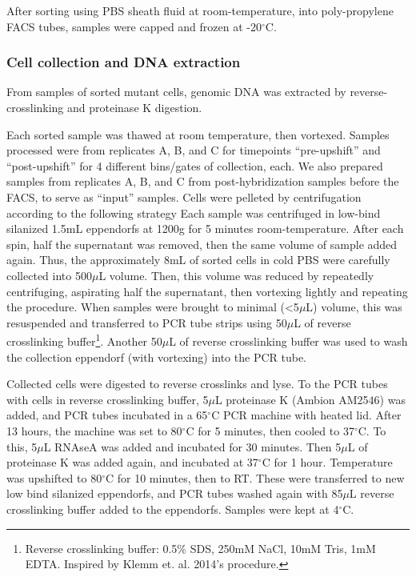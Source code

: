{After sorting using PBS sheath fluid at room-temperature, into
poly-propylene FACS tubes, samples were capped and frozen at
-20\(^{\circ}\)C.

\subsubsection{Cell collection and DNA
extraction}\label{cell-collection-and-dna-extraction}

From samples of sorted mutant cells, genomic DNA was extracted by
reverse-crosslinking and proteinase K digestion.

Each sorted sample was thawed at room temperature, then vortexed.
Samples processed were from replicates A, B, and C for timepoints
``pre-upshift'' and ``post-upshift'' for 4 different bins/gates of
collection, each. We also prepared samples from replicates A, B, and C
from post-hybridization samples before the FACS, to serve as ``input''
samples. Cells were pelleted by centrifugation according to the
following strategy Each sample was centrifuged in low-bind silanized
1.5mL eppendorfs at 1200g for 5 minutes room-temperature. After each
spin, half the supernatant was removed, then the same volume of sample
added again. Thus, the approximately 8mL of sorted cells in cold PBS
were carefully collected into 500\(\mu\)L volume. Then, this volume was
reduced by repeatedly centrifuging, aspirating half the supernatant,
then vortexing lightly and repeating the procedure. When samples were
brought to minimal (\textless{}5\(\mu\)L) volume, this was resuspended
and transferred to PCR tube strips using 50\(\mu\)L of reverse
crosslinking buffer\footnote{Reverse crosslinking buffer: 0.5\% SDS,
  250mM NaCl, 10mM Tris, 1mM EDTA. Inspired by Klemm et. al. 2014's
  procedure.}. Another 50\(\mu\)L of reverse crosslinking buffer was
used to wash the collection eppendorf (with vortexing) into the PCR
tube.

Collected cells were digested to reverse crosslinks and lyse. To the PCR
tubes with cells in reverse crosslinking buffer, 5\(\mu\)L proteinase K
(Ambion AM2546) was added, and PCR tubes incubated in a 65\(^{\circ}\)C
PCR machine with heated lid. After 13 hours, the machine was set to
80\(^{\circ}\)C for 5 minutes, then cooled to 37\(^{\circ}\)C. To this,
5\(\mu\)L RNAseA was added and incubated for 30 minutes. Then 5\(\mu\)L
of proteinase K was added again, and incubated at 37\(^{\circ}\)C for 1
hour. Temperature was upshifted to 80\(^{\circ}\)C for 10 minutes, then
to RT. These were transferred to new low bind silanized eppendorfs, and
PCR tubes washed again with 85\(\mu\)L reverse crosslinking buffer added
to the eppendorfs. Samples were kept at 4\(^{\circ}\)C.

}
